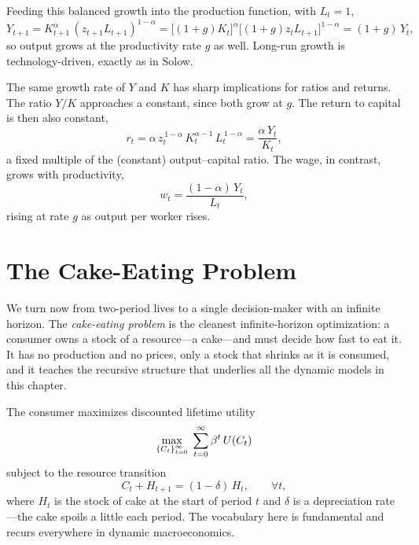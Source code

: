 Feeding this balanced growth into the production function, with $L_t = 1$,
\[
Y_{t+1} = K_{t+1}^{\alpha}\,(z_{t+1} L_{t+1})^{1-\alpha}
        = \big[(1+g)K_t\big]^{\alpha}\big[(1+g)z_t L_{t+1}\big]^{1-\alpha}
        = (1+g)\, Y_t,
\]
so output grows at the productivity rate $g$ as well. Long-run growth is technology-driven, exactly as in Solow.

The same growth rate of $Y$ and $K$ has sharp implications for ratios and returns. The ratio $Y/K$ approaches a constant, since both grow at $g$. The return to capital is then also constant,
\[
r_t = \alpha\, z_t^{\,1-\alpha}\, K_t^{\alpha-1}\, L_t^{\,1-\alpha} = \frac{\alpha\, Y_t}{K_t},
\]
a fixed multiple of the (constant) output--capital ratio. The wage, in contrast, grows with productivity,
\[
w_t = \frac{(1-\alpha)\,Y_t}{L_t},
\]
rising at rate $g$ as output per worker rises.


\section{The Cake-Eating Problem}

We turn now from two-period lives to a single decision-maker with an infinite horizon. The \emph{cake-eating problem} is the cleanest infinite-horizon optimization: a consumer owns a stock of a resource---a cake---and must decide how fast to eat it. It has no production and no prices, only a stock that shrinks as it is consumed, and it teaches the recursive structure that underlies all the dynamic models in this chapter.

The consumer maximizes discounted lifetime utility
\[
\max_{\left\{C_t\right\}_{t=0}^{\infty}}\; \sum_{t=0}^{\infty} \beta^t\, U(C_t)
\]
subject to the resource transition
\[
C_t + H_{t+1} = (1-\delta)\, H_t, \qquad \forall t,
\]
where $H_t$ is the stock of cake at the start of period $t$ and $\delta$ is a depreciation rate---the cake spoils a little each period. The vocabulary here is fundamental and recurs everywhere in dynamic macroeconomics.

